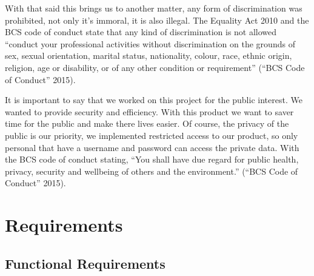 \documentclass[
  english,
  a4paper,
,tablecaptionabove
]{scrartcl}
\begin{document}
With that said this brings us to another matter, any form of
discrimination was prohibited, not only it's immoral, it is also
illegal. The Equality Act 2010 and the BCS code of conduct state that
any kind of discrimination is not allowed \enquote{conduct your
professional activities without discrimination on the grounds of sex,
sexual orientation, marital status, nationality, colour, race, ethnic
origin, religion, age or disability, or of any other condition or
requirement} (``BCS Code of Conduct'' 2015).

It is important to say that we worked on this project for the public
interest. We wanted to provide security and efficiency. With this
product we want to saver time for the public and make there lives
easier. Of course, the privacy of the public is our priority, we
implemented restricted access to our product, so only personal that have
a username and password can access the private data. With the BCS code
of conduct stating, \enquote{You shall have due regard for public
health, privacy, security and wellbeing of others and the environment.}
(``BCS Code of Conduct'' 2015).

\hypertarget{requirements}{%
\section{Requirements}\label{requirements}}

\hypertarget{functional-requirements}{%
\subsection{Functional Requirements}\label{functional-requirements}}
\end{document}
